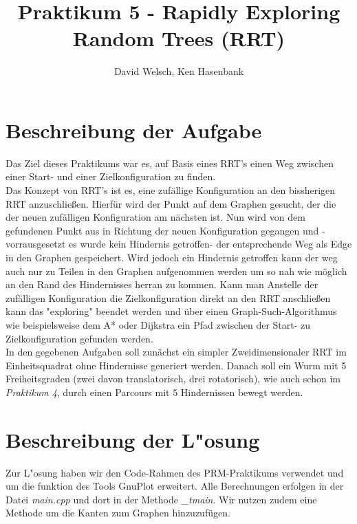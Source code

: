 \documentclass[a4paper]{scrartcl}
\begin{document}
\titlehead{Wintersemester 2017/2018\\Motion Planning\\Prof. Horsch, Rudi Scheitler}
\author{David Welsch, Ken Hasenbank}
\title{Praktikum 5 - Rapidly Exploring Random Trees (RRT)}
\maketitle

\section*{Beschreibung der Aufgabe}

Das Ziel dieses Praktikums war es, auf Basis eines RRT's einen Weg zwischen einer Start- und einer Zielkonfiguration zu finden. \\

Das Konzept von RRT's ist es, eine zufällige Konfiguration an den bissherigen RRT anzuschließen. Hierfür wird der Punkt auf dem Graphen gesucht, der die der neuen zufälligen Konfiguration am nächsten ist. Nun wird von dem gefundenen Punkt aus in Richtung der neuen Konfiguration gegangen und -vorrausgesetzt es wurde kein Hindernis getroffen- der entsprechende Weg als Edge in den Graphen gespeichert. Wird jedoch ein Hindernis getroffen kann der weg auch nur zu Teilen in den Graphen aufgenommen werden um so nah wie möglich an den Rand des Hindernisses herran zu kommen. Kann man Anstelle der zufälligen Konfiguration die Zielkonfiguration direkt an den RRT anschließen kann das "exploring" beendet werden und über einen Graph-Such-Algorithmus wie beispielsweise dem A* oder Dijkstra ein Pfad zwischen der Start- zu Zielkonfiguration gefunden werden.\\

In den gegebenen Aufgaben soll zunächst ein simpler Zweidimensionaler RRT im Einheitsquadrat ohne Hindernisse generiert werden. Danach soll ein Wurm mit 5 Freiheitsgraden (zwei davon translatorisch, drei rotatorisch), wie auch schon im \textit{Praktikum 4}, durch einen Parcours mit 5 Hindernissen bewegt werden.

\section*{Beschreibung der L"osung}

Zur L"osung haben wir den Code-Rahmen des PRM-Praktikums verwendet und um die funktion des Tools GnuPlot erweitert. Alle Berechnungen erfolgen in der Datei \textit{main.cpp} und dort in der Methode \textit{\_tmain}. Wir nutzen zudem eine Methode um die Kanten zum Graphen hinzuzufügen.\\
\end{document}
